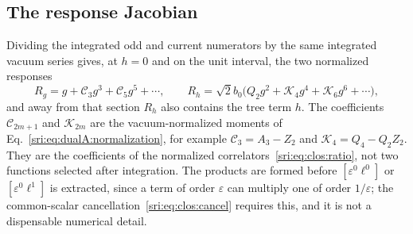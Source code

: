 \subsection{The response Jacobian}\label{sri:app:clos:jacobian}
Dividing the integrated odd and current numerators by the same integrated vacuum series gives, at $h=0$ and on the unit
interval, the two normalized responses
\begin{equation}
 R_g=g+\mathcal C_3g^3+\mathcal C_5g^5+\cdots,\qquad
 R_h=\sqrt2b_0\bigl(Q_2g^2+\mathcal K_4g^4+\mathcal K_6g^6+\cdots\bigr),
\end{equation}
and away from that section $R_h$ also contains the tree term $h$. The coefficients $\mathcal C_{2m+1}$ and
$\mathcal K_{2m}$ are the vacuum-normalized moments of Eq.~\eqref{sri:eq:dualA:normalization}, for example
$\mathcal C_3=A_3-Z_2$ and $\mathcal K_4=Q_4-Q_2Z_2$. They are the coefficients of the normalized
correlators~\eqref{sri:eq:clos:ratio}, not two functions selected after integration. The products are formed before
$[\varepsilon^0\ell^0]$ or $[\varepsilon^0\ell^1]$ is extracted, since a term of order $\varepsilon$ can multiply one of
order $1/\varepsilon$; the common-scalar cancellation~\eqref{sri:eq:clos:cancel} requires this, and it is not a dispensable
numerical detail.


